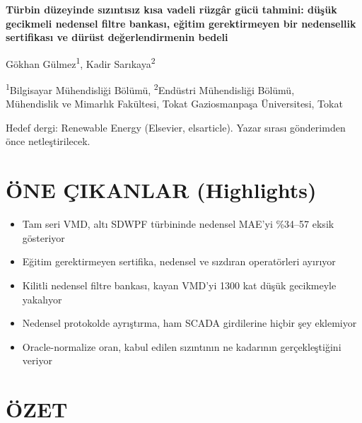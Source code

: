 \documentclass[11pt,a4paper]{article}
\begin{document}
\begin{center}
{\bfseries\large Türbin düzeyinde sızıntısız kısa vadeli rüzgâr gücü tahmini:
düşük gecikmeli nedensel filtre bankası, eğitim gerektirmeyen bir nedensellik
sertifikası ve dürüst değerlendirmenin bedeli\par}
\vspace{6pt}
Gökhan Gülmez\textsuperscript{1}, Kadir Sarıkaya\textsuperscript{2}\par
{\small \textsuperscript{1}Bilgisayar Mühendisliği Bölümü,
\textsuperscript{2}Endüstri Mühendisliği Bölümü,\\
Mühendislik ve Mimarlık Fakültesi, Tokat Gaziosmanpaşa Üniversitesi, Tokat\par}
\vspace{4pt}
{\footnotesize\textsf{Hedef dergi: Renewable Energy (Elsevier, elsarticle).
Yazar sırası gönderimden önce netleştirilecek.}}
\end{center}

\section*{ÖNE ÇIKANLAR (Highlights)}
\begin{itemize}\itemsep1pt
\item Tam seri VMD, altı SDWPF türbininde nedensel MAE'yi \%34--57 eksik gösteriyor
\item Eğitim gerektirmeyen sertifika, nedensel ve sızdıran operatörleri ayırıyor
\item Kilitli nedensel filtre bankası, kayan VMD'yi 1300 kat düşük gecikmeyle yakalıyor
\item Nedensel protokolde ayrıştırma, ham SCADA girdilerine hiçbir şey eklemiyor
\item Oracle-normalize oran, kabul edilen sızıntının ne kadarının gerçekleştiğini veriyor
\end{itemize}

\section*{ÖZET}
\end{document}
